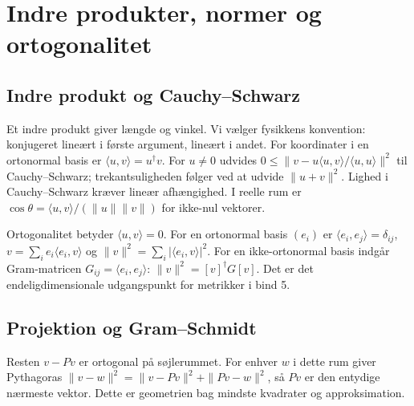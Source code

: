 \section{Indre produkter, normer og ortogonalitet}
\subsection{Indre produkt og Cauchy--Schwarz}
Et indre produkt giver længde og vinkel. Vi vælger fysikkens konvention:
konjugeret lineært i første argument, lineært i andet.
For koordinater i en ortonormal basis er $\langle u,v\rangle=u^\dagger v$.
For $u\ne0$ udvides
$0\le\|v-u\langle u,v\rangle/\langle u,u\rangle\|^2$
til Cauchy--Schwarz; trekantsuligheden følger ved at udvide
$\|u+v\|^2$. Lighed i Cauchy--Schwarz kræver lineær afhængighed.
I reelle rum er $\cos\theta=\langle u,v\rangle/(\|u\|\|v\|)$ for ikke-nul vektorer.

Ortogonalitet betyder $\langle u,v\rangle=0$.
For en ortonormal basis $(e_i)$ er $\langle e_i,e_j\rangle=\delta_{ij}$,
$v=\sum_i e_i\langle e_i,v\rangle$ og $\|v\|^2=\sum_i|\langle e_i,v\rangle|^2$.
For en ikke-ortonormal basis indgår Gram-matricen
$G_{ij}=\langle e_i,e_j\rangle$: $\|v\|^2=[v]^\dagger G[v]$.
Det er det endeligdimensionale udgangspunkt for metrikker i bind 5.

\subsection{Projektion og Gram--Schmidt}
Resten $v-Pv$ er ortogonal på søjlerummet.
For enhver $w$ i dette rum giver Pythagoras
$\|v-w\|^2=\|v-Pv\|^2+\|Pv-w\|^2$, så $Pv$ er den entydige nærmeste
vektor. Dette er geometrien bag mindste kvadrater og approksimation.



